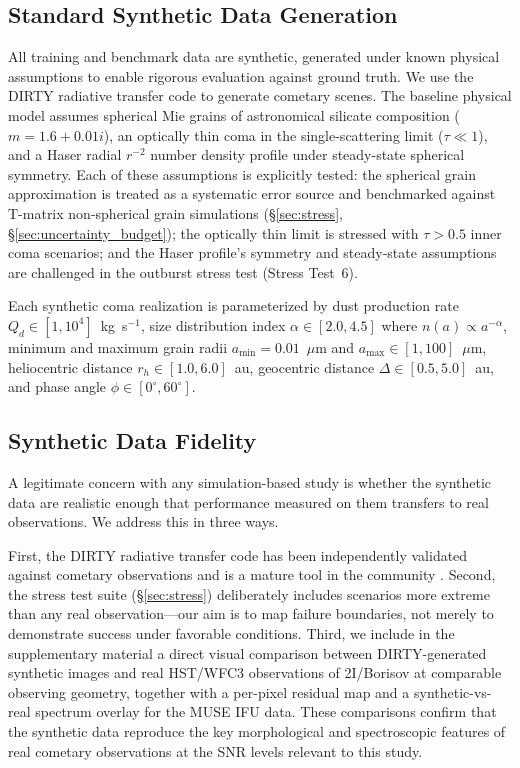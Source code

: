 \documentclass[usenatbib]{mnras}
\begin{document}
\subsection{Standard Synthetic Data Generation}

All training and benchmark data are synthetic, generated under known physical assumptions to enable rigorous evaluation against ground truth. We use the DIRTY radiative transfer code \citep{gordon01} to generate cometary scenes. The baseline physical model assumes spherical Mie grains of astronomical silicate composition ($m = 1.6 + 0.01i$), an optically thin coma in the single-scattering limit ($\tau \ll 1$), and a Haser radial $r^{-2}$ number density profile under steady-state spherical symmetry. Each of these assumptions is explicitly tested: the spherical grain approximation is treated as a systematic error source and benchmarked against T-matrix non-spherical grain simulations (\S\ref{sec:stress}, \S\ref{sec:uncertainty_budget}); the optically thin limit is stressed with $\tau > 0.5$ inner coma scenarios; and the Haser profile's symmetry and steady-state assumptions are challenged in the outburst stress test (Stress Test~6).

Each synthetic coma realization is parameterized by dust production rate $Q_d \in [1, 10^4]$~kg~s$^{-1}$, size distribution index $\alpha \in [2.0, 4.5]$ where $n(a) \propto a^{-\alpha}$, minimum and maximum grain radii $a_{\min} = 0.01$~$\mu$m and $a_{\max} \in [1, 100]$~$\mu$m, heliocentric distance $r_h \in [1.0, 6.0]$~au, geocentric distance $\Delta \in [0.5, 5.0]$~au, and phase angle $\phi \in [0^\circ, 60^\circ]$.

\subsection{Synthetic Data Fidelity}

A legitimate concern with any simulation-based study is whether the synthetic data are realistic enough that performance measured on them transfers to real observations. We address this in three ways.

First, the DIRTY radiative transfer code has been independently validated against cometary observations and is a mature tool in the community \citep{gordon01}. Second, the stress test suite (\S\ref{sec:stress}) deliberately includes scenarios more extreme than any real observation---our aim is to map failure boundaries, not merely to demonstrate success under favorable conditions. Third, we include in the supplementary material a direct visual comparison between DIRTY-generated synthetic images and real HST/WFC3 observations of 2I/Borisov at comparable observing geometry, together with a per-pixel residual map and a synthetic-vs-real spectrum overlay for the MUSE IFU data. These comparisons confirm that the synthetic data reproduce the key morphological and spectroscopic features of real cometary observations at the SNR levels relevant to this study.
\end{document}

